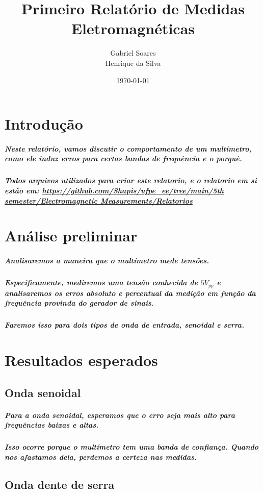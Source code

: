 \documentclass[12pt,twoside, a4paper, twocolumn]{article}
\title{Primeiro Relatório de Medidas Eletromagnéticas}
\author{Gabriel Soares \\ Henrique da Silva}
\date{\today}
\begin{document}
\maketitle
{}
\newpage
\tableofcontents
\newpage



\section{Introdução}


\subparagraph*{Neste relatório, vamos discutir o comportamento de um multímetro, como ele induz erros para certas bandas de frequência e o porquê.}

\subparagraph*{Todos arquivos utilizados para criar este relatorio, e o relatorio em si estão em:  \url{https://github.com/Shapis/ufpe_ee/tree/main/5th semester/Electromagnetic Measurements/Relatorios}}




\section{Análise preliminar}

\subparagraph*{Analisaremos a maneira que o multímetro mede tensões.}

\subparagraph*{Especificamente, mediremos uma tensão conhecida de $5 V_{pp}$ e analisaremos os erros absoluto e percentual da medição em função da frequência provinda do gerador de sinais.}

\subparagraph*{Faremos isso para dois tipos de onda de entrada, senoidal e serra.}

\section{Resultados esperados}

\subsection{Onda senoidal}

\subparagraph*{Para a onda senoidal, esperamos que o erro seja mais alto para frequências baixas e altas.}

\subparagraph*{Isso ocorre porque o multímetro tem uma banda de confiança. Quando nos afastamos dela, perdemos a certeza nas medidas.}

\subsection{Onda dente de serra}
\end{document}
